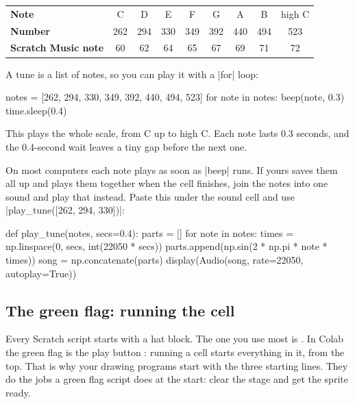 \begin{center}
\renewcommand{\arraystretch}{1.3}
\begin{tabular}{l*{8}{c}}
\toprule
\textbf{Note} & C & D & E & F & G & A & B & high C \\
\textbf{Number} & 262 & 294 & 330 & 349 & 392 & 440 & 494 & 523 \\
\textbf{Scratch Music note} & 60 & 62 & 64 & 65 & 67 & 69 & 71 & 72 \\
\bottomrule
\end{tabular}
\end{center}

A tune is a list of notes, so you can play it with a \py|for| loop:

\begin{code}
notes = [262, 294, 330, 349, 392, 440, 494, 523]
for note in notes:
    beep(note, 0.3)
    time.sleep(0.4)
\end{code}

This plays the whole scale, from C up to high C. Each note lasts 0.3 seconds, and the 0.4-second wait leaves a tiny gap before the next one.

\begin{think}
On most computers each note plays as soon as \py|beep| runs. If yours saves them all up and plays them together when the cell finishes, join the notes into one sound and play that instead. Paste this under the sound cell and use \py|play_tune([262, 294, 330])|:
\begin{codenonum}
def play_tune(notes, secs=0.4):
    parts = []
    for note in notes:
        times = np.linspace(0, secs, int(22050 * secs))
        parts.append(np.sin(2 * np.pi * note * times))
    song = np.concatenate(parts)
    display(Audio(song, rate=22050, autoplay=True))
\end{codenonum}
\end{think}

\subsection*{The green flag: running the cell}

Every Scratch script starts with a hat block. The one you use most is . In Colab the green flag is the play button \playbtn: running a cell starts everything in it, from the top. That is why your drawing programs start with the three starting lines. They do the jobs a green flag script does at the start: clear the stage and get the sprite ready.

